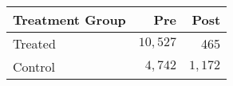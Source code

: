 \begin{tabular}{lrr}
\toprule
Treatment Group & Pre & Post \\ 
\midrule\addlinespace[2.5pt]
Treated & $10,527$ & 465 \\ 
Control & $4,742$ & $1,172$ \\ 
\bottomrule
\end{tabular}

